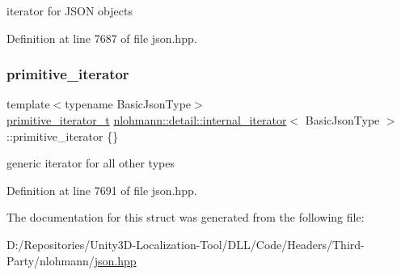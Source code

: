 iterator for J\+S\+ON objects 



Definition at line 7687 of file json.\+hpp.

\mbox{\label{structnlohmann_1_1detail_1_1internal__iterator_a2b3bb45f968210e42c282017eeeb63a8}} 
\subsubsection{\texorpdfstring{primitive\_iterator}{primitive\_iterator}}
{\footnotesize\ttfamily template$<$typename Basic\+Json\+Type$>$ \\
\mbox{\hyperlink{classnlohmann_1_1detail_1_1primitive__iterator__t}{primitive\+\_\+iterator\+\_\+t}} \mbox{\hyperlink{structnlohmann_1_1detail_1_1internal__iterator}{nlohmann\+::detail\+::internal\+\_\+iterator}}$<$ Basic\+Json\+Type $>$\+::primitive\+\_\+iterator \{\}}



generic iterator for all other types 



Definition at line 7691 of file json.\+hpp.



The documentation for this struct was generated from the following file\+:\begin{DoxyCompactItemize}
\item 
D\+:/\+Repositories/\+Unity3\+D-\/\+Localization-\/\+Tool/\+D\+L\+L/\+Code/\+Headers/\+Third-\/\+Party/nlohmann/\mbox{\hyperlink{json_8hpp}{json.\+hpp}}\end{DoxyCompactItemize}

